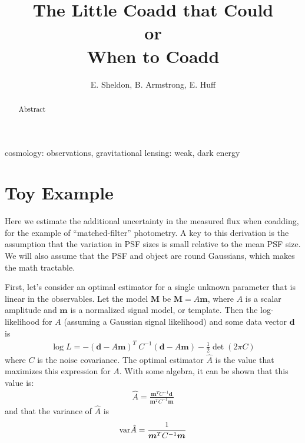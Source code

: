 \documentclass[a4paper,fleqn,usenatbib,referee]{mnras}
\title{The Little Coadd that Could\\
or\\
When to Coadd}
\author[E. Sheldon, B. Armstrong, E. Huff]{E. Sheldon, B. Armstrong, E. Huff}
\begin{document}
\maketitle

\begin{abstract}

    Abstract

\end{abstract}


\begin{keywords}                                                                    
    cosmology: observations,
    gravitational lensing: weak,
    dark energy
\end{keywords} 

\section{Toy Example} \label{sec:intro}

Here we estimate the additional uncertainty in the measured flux when coadding,
for the example of ``matched-filter'' photometry.  A key to this derivation is
the assumption that the variation in PSF sizes is small relative to the mean
PSF size.  We will also assume that the PSF and object are round Gaussians,
which makes the math tractable.

First, let's consider an optimal estimator for a single unknown parameter that
is linear in the observables. Let the model $\boldsymbol{M}$ be $\boldsymbol{M}
= A\boldsymbol{m}$, where $A$ is a scalar amplitude and $\boldsymbol{m}$ is a
normalized signal model, or template. Then the log-likelihood for $A$ (assuming
a Gaussian signal likelihood) and some data vector $\boldsymbol{d}$ is
\begin{align}
  \log L = - (\boldsymbol{d} - A\boldsymbol{m})^T\: C^{-1} (\boldsymbol{d} - A\boldsymbol{m}) - \frac{1}{2} \det(2\pi C )
\end{align}
where $C$ is the noise covariance. The optimal estimator $\hat{A}$ is the value
that maximizes this expression for $A$. With some algebra, it can be shown that
this value is:
\begin{align}
\hat{A} = \frac{\boldsymbol{m}^T C^{-1} \boldsymbol{d}}{\boldsymbol{m}^T C^{-1} \boldsymbol{m}}
\end{align}
and that the variance of $\hat{A}$ is
\begin{align}
{\rm var}\hat{A} = \frac{1}{{\boldsymbol{m}^T C^{-1} \boldsymbol{m}}}
\end{align}
\end{document}
